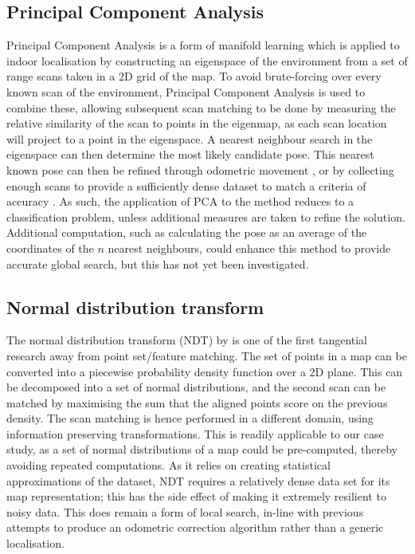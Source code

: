 \documentclass[authoryearcitations]{UoYCSproject}
\begin{document}
\subsection{Principal Component Analysis}
Principal Component Analysis is a form of manifold learning which is applied to indoor localisation by constructing an eigenspace of the environment from a set of range scans taken in a 2D grid of the map. To avoid brute-forcing over every known scan of the environment, Principal Component Analysis is used to combine these, allowing subsequent scan matching to be done by measuring the relative similarity of the scan to points in the eigenmap, as each scan location will project to a point in the eigenspace. A nearest neighbour search in the eigenspace can then determine the most likely candidate pose. This nearest known pose can then be refined through odometric movement \cite{Pourraz1999-nu}, or by collecting enough scans to provide a sufficiently dense dataset to match a criteria of accuracy \cite{Pourraz1999-nu}. As such, the application of PCA to the method reduces to a classification problem, unless additional measures are taken to refine the solution. Additional computation, such as calculating the pose as an average of the coordinates of the $n$ nearest neighbours, could enhance this method to provide accurate global search, but this has not yet been investigated. 

\subsection{Normal distribution transform}
The normal distribution transform (NDT) by \citet{Biber2003-kb} is one of the first tangential research away from point set/feature matching. The set of points in a map can be converted into a piecewise probability density function over a 2D plane. This can be decomposed into a set of normal distributions, and the second scan can be matched by maximising the sum that the aligned points score on the previous density. The scan matching is hence performed in a different domain, using information preserving transformations. This is readily applicable to our case study, as a set of normal distributions of a map could be pre-computed, thereby avoiding repeated computations. As it relies on creating statistical approximations of the dataset, NDT requires a relatively dense data set for its map representation; this has the side effect of making it extremely resilient to noisy data. This does remain a form of local search, in-line with previous attempts to produce an odometric correction algorithm rather than a generic localisation. 
\end{document}
